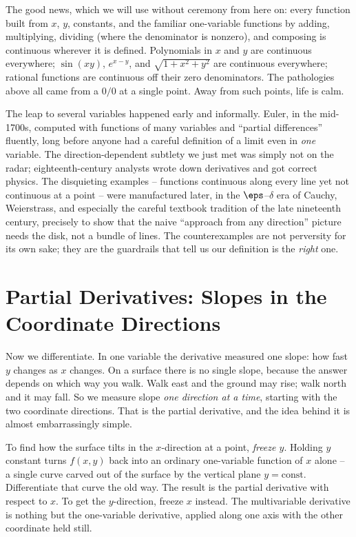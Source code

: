 The good news, which we will use without ceremony from here on: every function built from
$x$, $y$, constants, and the familiar one-variable functions by adding, multiplying, dividing
(where the denominator is nonzero), and composing is continuous wherever it is defined.
Polynomials in $x$ and $y$ are continuous everywhere; $\sin(xy)$, $e^{x-y}$, and
$\sqrt{1+x^2+y^2}$ are continuous everywhere; rational functions are continuous off their zero
denominators. The pathologies above all came from a $0/0$ at a single point. Away from such
points, life is calm.

\begin{historybox}
The leap to several variables happened early and informally. Euler, in the
mid-1700s, computed with functions of many variables and ``partial differences'' fluently,
long before anyone had a careful definition of a limit even in \emph{one} variable. The
direction-dependent subtlety we just met was simply not on the radar; eighteenth-century
analysts wrote down derivatives and got correct physics. The disquieting examples -- functions
continuous along every line yet not continuous at a point -- were manufactured later, in the
$\eps$--$\delta$ era of Cauchy, Weierstrass, and especially the careful textbook tradition of
the late nineteenth century, precisely to show that the naive ``approach from any direction''
picture needs the disk, not a bundle of lines. The counterexamples are not perversity for its
own sake; they are the guardrails that tell us our definition is the \emph{right} one.
\end{historybox}

\section{Partial Derivatives: Slopes in the Coordinate Directions}
\label{ch32:sec-partials}

Now we differentiate. In one variable the derivative measured one slope: how fast $y$ changes
as $x$ changes. On a surface there is no single slope, because the answer depends on which way
you walk. Walk east and the ground may rise; walk north and it may fall. So we measure slope
\emph{one direction at a time}, starting with the two coordinate directions. That is the
partial derivative, and the idea behind it is almost embarrassingly simple.

\begin{intuitionbox}
To find how the surface tilts in the $x$-direction at a point, \emph{freeze $y$}. Holding
$y$ constant turns $f(x,y)$ back into an ordinary one-variable function of $x$ alone -- a
single curve carved out of the surface by the vertical plane $y=\text{const}$. Differentiate
that curve the old way. The result is the partial derivative with respect to $x$. To get the
$y$-direction, freeze $x$ instead. The multivariable derivative is nothing but the
one-variable derivative, applied along one axis with the other coordinate held still.
\end{intuitionbox}

